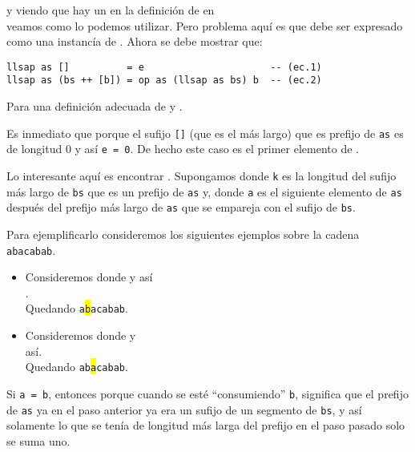 y viendo que hay un  en la definición de  en\\
 veamos como lo podemos utilizar. Pero problema aquí es
que  debe ser expresado como una instancía de . Ahora se
debe mostrar que:

\begin{verbatim}
llsap as []          = e                      -- (ec.1)
llsap as (bs ++ [b]) = op as (llsap as bs) b  -- (ec.2)
\end{verbatim}
Para una definición adecuada de  y . 

Es inmediato que  porque el sufijo \texttt{[]} (que es el más largo) que
es prefijo de \texttt{as} es de longitud 0 y así \texttt{e = 0}. De hecho este caso es el primer
elemento de .

Lo interesante aquí es encontrar . Supongamos donde \texttt{k}
es la longitud del sufijo más largo de \texttt{bs} que es un prefijo de \texttt{as} y,
\label{funcional:func_error_a} donde \texttt{a} es el siguiente
elemento de \texttt{as} después del prefijo más largo de \texttt{as} que se empareja con el
sufijo de \texttt{bs}.

Para ejemplificarlo consideremos los siguientes ejemplos sobre la cadena \texttt{abacabab}.
\begin{itemize}
\item Consideremos donde y así\\
.\\
Quedando \texttt{a\colorbox{yellow}b}\texttt{acabab}.
\item Consideremos donde y\\
así.\\
Quedando \texttt{ab\colorbox{yellow}a}\texttt{cabab}.
\end{itemize}

Si \texttt{a = b}, entonces  porque cuando se esté
``consumiendo'' \texttt{b}, significa que el prefijo de \texttt{as} ya en el paso anterior ya era
un sufijo de un segmento de \texttt{bs}, y así solamente lo que se tenía de longitud más larga del
prefijo en el paso pasado solo se suma uno.

